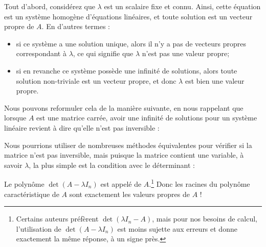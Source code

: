 Tout d'abord, considérez que $\lambda$ est un scalaire fixe et connu.  Ainsi,
cette équation est un système homogène d'équations linéaires, et
toute solution  est un vecteur propre de $A$.  En
d'autres termes :  
\begin{itemize}
\item si ce système a une solution unique, alors il n'y a pas
de vecteurs propres correspondant à $\lambda$, ce qui signifie que $\lambda$ n'est pas une valeur propre; 
\item si en revanche ce système possède une infinité de solutions, alors toute solution non-triviale
est un vecteur propre, et donc $\lambda$ est bien une valeur propre.
\end{itemize}
Nous pouvons reformuler cela de la manière suivante, en nous rappelant que lorsque $A$ est
une matrice carrée, avoir une infinité de solutions pour un système 
linéaire revient à dire qu'elle n'est pas inversible :


Nous pourrions utiliser de nombreuses méthodes équivalentes pour vérifier si la matrice n'est pas
inversible, mais puisque la matrice contient une variable, à savoir 
$\lambda$, la plus simple est la condition avec le déterminant :


\begin{definition}\label{charpoly}
Le polynôme $\det( A- \lambda I_n)$ est appelé  de $A$.\footnote{Certains auteurs préfèrent $\det( \lambda I_n -A)$, mais pour nos besoins de calcul, l'utilisation de $\det( A- \lambda I_n)$ est moins sujette aux erreurs et donne exactement la même réponse, à un signe près.} Donc les racines du polyn\^ome caract\'eristique de $A$ sont exactement les valeurs propres de $A$ !
\end{definition}

